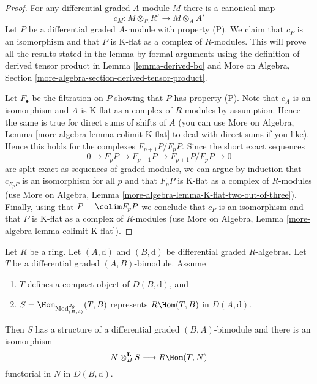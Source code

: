 \begin{proof}
For any differential graded $A$-module $M$ there is a canonical map
$$
c_M : M \otimes_R R' \longrightarrow M \otimes_A A'
$$
Let $P$ be a differential graded $A$-module with property (P).
We claim that $c_P$ is an isomorphism and that $P$ is K-flat
as a complex of $R$-modules. This will prove all the results
stated in the lemma by formal arguments using the definition
of derived tensor product in Lemma \ref{lemma-derived-bc} and
More on Algebra, Section \ref{more-algebra-section-derived-tensor-product}.

\medskip\noindent
Let $F_\bullet$ be the filtration on $P$ showing that $P$ has property (P).
Note that $c_A$ is an isomorphism and $A$ is K-flat as a complex
of $R$-modules by assumption. Hence the same is true for
direct sums of shifts of $A$ (you can use
More on Algebra, Lemma \ref{more-algebra-lemma-colimit-K-flat}
to deal with direct sums if you like).
Hence this holds for the complexes $F_{p + 1}P/F_pP$.
Since the short exact sequences
$$
0 \to F_pP \to F_{p + 1}P \to F_{p + 1}P/F_pP \to 0
$$
are split exact as sequences of graded modules, we can argue
by induction that $c_{F_pP}$ is an isomorphism for all $p$
and that $F_pP$ is K-flat as a complex of $R$-modules (use
More on Algebra, Lemma \ref{more-algebra-lemma-K-flat-two-out-of-three}).
Finally, using that $P = \colim F_pP$ we conclude that
$c_P$ is an isomorphism and that $P$ is K-flat
as a complex of $R$-modules (use
More on Algebra, Lemma \ref{more-algebra-lemma-colimit-K-flat}).
\end{proof}

\begin{lemma}
\label{lemma-RHom-is-tensor}
Let $R$ be a ring.
Let $(A, \text{d})$ and $(B, \text{d})$ be differential graded $R$-algebras.
Let $T$ be a differential graded $(A, B)$-bimodule.
Assume
\begin{enumerate}
\item $T$ defines a compact object of $D(B, \text{d})$, and
\item $S = \Hom_{\text{Mod}^{dg}_{(B, \text{d})}}(T, B)$
represents $R\Hom(T, B)$ in $D(A, \text{d})$.
\end{enumerate}
Then $S$ has a structure of a differential graded $(B, A)$-bimodule
and there is an isomorphism
$$
N \otimes_B^\mathbf{L} S \longrightarrow R\Hom(T, N)
$$
functorial in $N$ in $D(B, \text{d})$.
\end{lemma}

